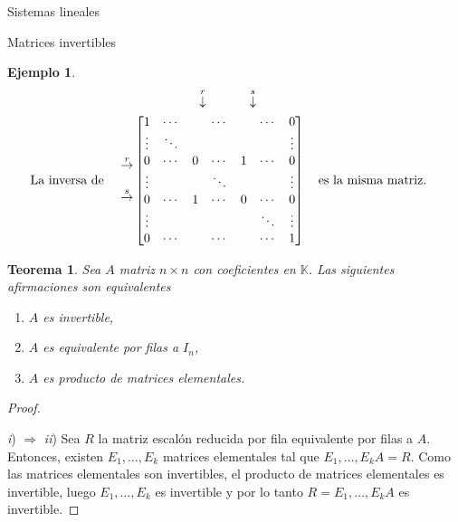 \documentclass[a4paper,12pt,twoside,spanish]{amsbook}
\newtheorem{teorema}{Teorema}[section]
\theoremstyle{definition}
\newtheorem{ejemplo}{Ejemplo}[section]
\theoremstyle{remark}
\newcommand{\K}{\mathbb K}
\begin{document}
\begin{chapter}{Sistemas lineales}
\begin{section}{Matrices invertibles}
\begin{ejemplo}
			\begin{align*}
			&\begin{matrix}
			{}^{}&{}^{}&{}^{}&{}^{}&{}^{}&\overset{r}{\downarrow}&{}^{}&{}^{}&{}^{}{}^{}\overset{s}{\downarrow}&{}^{}
			\end{matrix} \\
			\text{La inversa de \quad}\begin{matrix}
			{}^{}\\{}^{}\\
			\overset{r}{\to}\\
			{}^{}\\
			\overset{s}{\to}\\{}^{}\\
			{}^{}
			\end{matrix}
			&\begin{bmatrix}
			1 & \cdots &  &\cdots &&\cdots& 0  \\
			\vdots  & \ddots  & & &&& \vdots \\
			0 & \cdots &0 &\cdots&1&\cdots &0 \\
			\vdots  &   & &\ddots &&& \vdots \\
			0  & \cdots  &1 &\cdots &0& \cdots& 0 \\
			\vdots  &   & & &&\ddots& \vdots \\
			0  & \cdots  & &\cdots &&\cdots& 1
			\end{bmatrix}
			\text{\quad es la misma matriz.\quad}
			\end{align*}
		
						
		
	
\end{ejemplo}
		
		
			
			
			\begin{teorema}\label{mtrx-inv-equiv} Sea $A$ matriz $n \times n$ con coeficientes en $\K$. Las siguientes afirmaciones son equivalentes
				\begin{enumerate}
					\item[\textit{i})] $A$ es invertible,
					\item[\textit{ii})] $A$  es equivalente por filas a $I_n$, 
					\item[\textit{iii})] $A$ es producto de matrices elementales.
				\end{enumerate}
			\end{teorema}
			\begin{proof}
				
				\
				
				\textit{i}) $\Rightarrow$ \textit{ii}) Sea $R$ la matriz escalón reducida por fila equivalente por filas a $A$. Entonces,  existen $E_1,\ldots,E_k$ matrices elementales tal que $E_1,\ldots,E_kA = R$. Como las matrices elementales son invertibles, el producto de matrices elementales es invertible, luego  $E_1,\ldots,E_k$ es invertible y por lo tanto $R=E_1,\ldots,E_kA$ es invertible. 
				

\end{proof}
\end{section}
\end{chapter}
\end{document}
